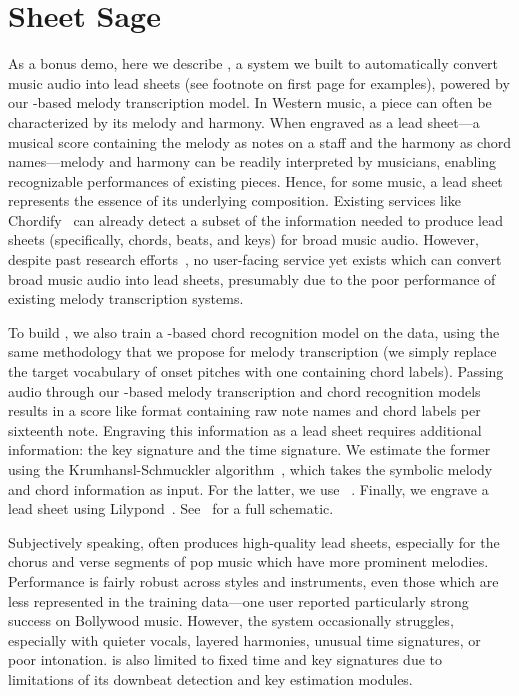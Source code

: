 \vspace{-2mm}
\section{Sheet Sage}
\label{sec:sheetsage}

As a bonus demo, 
here we describe \sheetsage, a system we built to automatically convert music audio into lead sheets (see footnote on first page for examples), powered by our \jukebox-based melody transcription model. 
In Western music, a piece can often be characterized by its melody and harmony. 
When engraved as a lead sheet---a musical score containing the melody as notes on a staff and the harmony as chord names---melody and harmony can be readily interpreted by musicians, enabling recognizable performances of existing pieces. 
Hence, for some music, a lead sheet represents the essence of its underlying composition.
Existing services like Chordify~\cite{de2014chordify} can already detect a subset of the information needed to produce lead sheets (specifically, chords, beats, and keys) for broad music audio. 
However, despite past research efforts~\cite{ryynanen2008automatic,weil2009automatic}, no user-facing service yet exists which can convert broad music audio into lead sheets, presumably due to the poor performance of existing melody transcription systems.

To build \sheetsage, we also train a \jukebox-based chord recognition model on the \hooktheory{} data, using the same methodology that we propose for melody transcription (we simply replace the target vocabulary of onset pitches with one containing chord labels).
Passing audio through our \jukebox{}-based melody transcription and chord recognition models results in a score like format containing raw note names and chord labels per sixteenth note. 
Engraving this information as a lead sheet requires additional information: the key signature and the time signature. 
We estimate the former using the Krumhansl-Schmuckler algorithm~\cite{krumhansl1990cognitive,temperley1999key}, which takes the symbolic melody and chord information as input. 
For the latter, we use \madmom~\cite{bock2016madmom,bock2016joint}. 
Finally, we engrave a lead sheet using Lilypond~\cite{nienhuys2003lilypond}. 
See~ for a full schematic.

Subjectively speaking, \sheetsage{} often produces high-quality lead sheets, especially for the chorus and verse segments of pop music which have more prominent melodies. 
Performance is fairly robust across styles and instruments, even those which are less represented in the training data---one user reported particularly strong success on Bollywood music. 
However, the system occasionally struggles, especially with quieter vocals, layered harmonies, unusual time signatures, or poor intonation. 
\sheetsage{} is also limited to fixed time and key signatures due to limitations of its downbeat detection and key estimation modules.